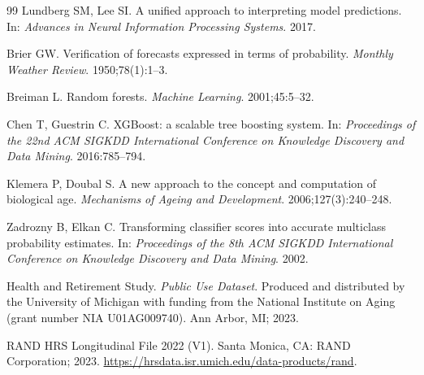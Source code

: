 \documentclass[11pt,a4paper]{article}
\begin{document}
\begin{thebibliography}{99}
 Lundberg SM, Lee SI. A unified approach to interpreting model predictions.
In: \textit{Advances in Neural Information Processing Systems}. 2017.

 Brier GW. Verification of forecasts expressed in terms of probability.
\textit{Monthly Weather Review}. 1950;78(1):1--3.

 Breiman L. Random forests. \textit{Machine Learning}. 2001;45:5--32.

 Chen T, Guestrin C. XGBoost: a scalable tree boosting system. In:
\textit{Proceedings of the 22nd ACM SIGKDD International Conference on Knowledge Discovery
and Data Mining}. 2016:785--794.

 Klemera P, Doubal S. A new approach to the concept and computation of
biological age. \textit{Mechanisms of Ageing and Development}. 2006;127(3):240--248.

 Zadrozny B, Elkan C. Transforming classifier scores into accurate multiclass
probability estimates. In: \textit{Proceedings of the 8th ACM SIGKDD International Conference on
Knowledge Discovery and Data Mining}. 2002.

 Health and Retirement Study. \textit{Public Use Dataset}. Produced and distributed
by the University of Michigan with funding from the National Institute on Aging (grant number
NIA U01AG009740). Ann Arbor, MI; 2023.

 RAND HRS Longitudinal File 2022 (V1). Santa Monica, CA: RAND Corporation; 2023.
\url{https://hrsdata.isr.umich.edu/data-products/rand}.

\end{thebibliography}
\end{document}
